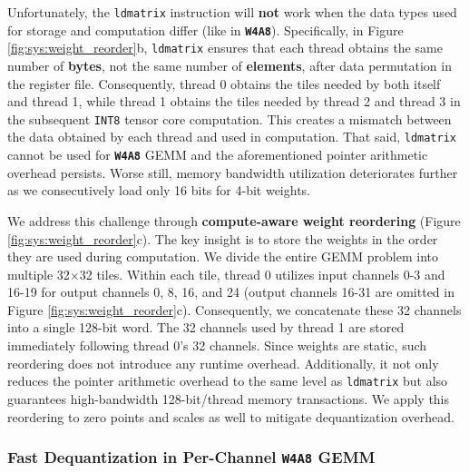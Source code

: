 Unfortunately, the \texttt{ldmatrix} instruction will \textbf{not} work when the data types used for storage and computation differ (like in \textbf{\texttt{W4A8}}). Specifically, in Figure \ref{fig:sys:weight_reorder}b, \texttt{ldmatrix} ensures that each thread obtains the same number of \textbf{bytes}, not the same number of \textbf{elements}, after data permutation in the register file. Consequently, thread 0 obtains the tiles needed by both itself and thread 1, while thread 1 obtains the tiles needed by thread 2 and thread 3 in the subsequent \texttt{INT8} tensor core computation. This creates a mismatch between the data obtained by each thread and used in computation. That said, \texttt{ldmatrix} cannot be used for \textbf{\texttt{W4A8}} GEMM and the aforementioned pointer arithmetic overhead persists. Worse still, memory bandwidth utilization deteriorates further as we consecutively load only 16 bits for 4-bit weights.

We address this challenge through \textbf{compute-aware weight reordering} (Figure \ref{fig:sys:weight_reorder}c). The key insight is to store the weights in the order they are used during computation. We divide the entire GEMM problem into multiple 32$\times$32 tiles. Within each tile, thread 0 utilizes input channels 0-3 and 16-19 for output channels 0, 8, 16, and 24 (output channels 16-31 are omitted in Figure \ref{fig:sys:weight_reorder}c). Consequently, we concatenate these 32 channels into a single 128-bit word. The 32 channels used by thread 1 are stored immediately following thread 0's 32 channels. Since weights are static, such reordering does not introduce any runtime overhead. Additionally, it not only reduces the pointer arithmetic overhead to the same level as \texttt{ldmatrix} but also guarantees high-bandwidth 128-bit/thread memory transactions. We apply this reordering to zero points and scales as well to mitigate dequantization overhead. 

\subsubsection{Fast Dequantization in Per-Channel \textbf{\texttt{W4A8}} GEMM}
\label{sect:system:gemm:per_channel}


